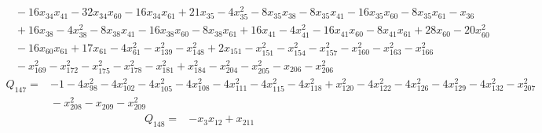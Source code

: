 {\begin{align*}
 &{}-16x_{34}x_{41} -32x_{34}x_{60} -16x_{34}x_{61} +21x_{35} -4x_{35}^{2} -8x_{35}x_{38} -8x_{35}x_{41} -16x_{35}x_{60} -8x_{35}x_{61} -x_{36}\\
 &{}+16x_{38} -4x_{38}^{2} -8x_{38}x_{41} -16x_{38}x_{60} -8x_{38}x_{61} +16x_{41} -4x_{41}^{2} -16x_{41}x_{60} -8x_{41}x_{61} +28x_{60} -20x_{60}^{2}\\
 &{}-16x_{60}x_{61} +17x_{61} -4x_{61}^{2} -x_{139}^{2} -x_{148}^{2} +2x_{151} -x_{151}^{2} -x_{154}^{2} -x_{157}^{2} -x_{160}^{2} -x_{163}^{2} -x_{166}^{2}\\
 &{}-x_{169}^{2} -x_{172}^{2} -x_{175}^{2} -x_{178}^{2} -x_{181}^{2} +x_{184}^{2} -x_{204}^{2} -x_{205}^{2} -x_{206} -x_{206}^{2}
\end{align*}
\begin{align*}
 Q_{147}={}&-1 -4x_{98}^{2} -4x_{102}^{2} -4x_{105}^{2} -4x_{108}^{2} -4x_{111}^{2} -4x_{115}^{2} -4x_{118}^{2} +x_{120}^{2} -4x_{122}^{2} -4x_{126}^{2} -4x_{129}^{2} -4x_{132}^{2} -x_{207}^{2}\\
 &{}-x_{208}^{2} -x_{209} -x_{209}^{2}
\end{align*}
\begin{align*}
 Q_{148}={}&-x_{3}x_{12} +x_{211}
\end{align*}
}
